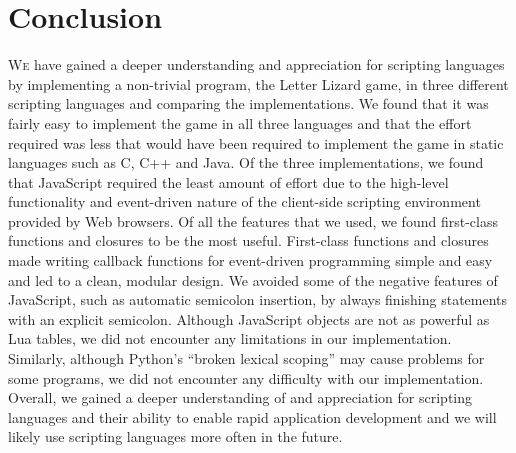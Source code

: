 \section{Conclusion}
\label{conclusion}

\lettrine[nindent=0em,lines=3]{W}{e} have gained a deeper understanding and
appreciation for scripting languages by implementing a non-trivial program,
the Letter Lizard game, in three different scripting languages and comparing the
implementations. We found that it was fairly easy to implement the game in
all three languages and that the effort required was less that would have been
required to implement the game in static languages such as C, C++ and Java.
Of the three implementations, we found that JavaScript required the least
amount of effort due to the high-level functionality and event-driven nature 
of the client-side scripting environment provided by Web browsers. Of all the features
that we used, we found first-class functions and  closures to be the most useful. 
First-class functions and closures made writing callback functions for event-driven
programming simple and easy and led to a clean, modular design. We avoided some of
the negative features of JavaScript, such as automatic semicolon insertion, by
always finishing statements with an explicit semicolon. Although JavaScript objects
are not as powerful as Lua tables, we did not encounter any limitations in our
implementation. Similarly, although Python's ``broken lexical scoping'' may cause
problems for some programs, we did not encounter any difficulty with our implementation.
Overall, we gained a deeper understanding of and appreciation for scripting languages
and their ability to enable rapid application development and we will likely use
scripting languages more often in the future.
